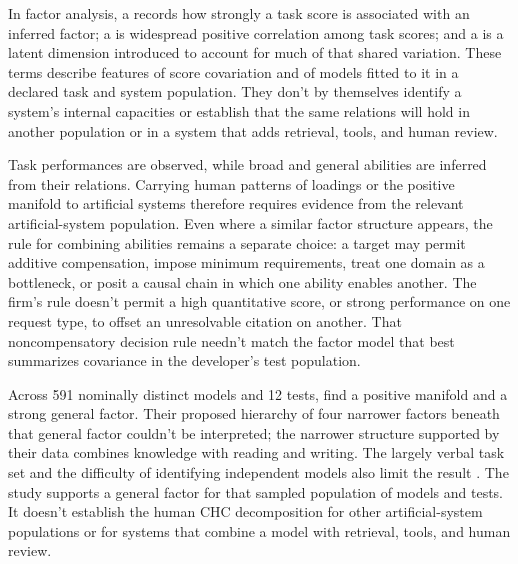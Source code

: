 \documentclass[12pt]{article}
\begin{document}
In factor analysis, a  records how strongly a task score is associated with an inferred factor; a  is widespread positive correlation among task scores; and a  is a latent dimension introduced to account for much of that shared variation. These terms describe features of score covariation and of models fitted to it in a declared task and system population. They don't by themselves identify a system's internal capacities or establish that the same relations will hold in another population or in a system that adds retrieval, tools, and human review.

Task performances are observed, while broad and general abilities are inferred from their relations. Carrying human patterns of loadings or the positive manifold to artificial systems therefore requires evidence from the relevant artificial-system population. Even where a similar factor structure appears, the rule for combining abilities remains a separate choice: a target may permit additive compensation, impose minimum requirements, treat one domain as a bottleneck, or posit a causal chain in which one ability enables another. The firm's rule doesn't permit a high quantitative score, or strong performance on one request type, to offset an unresolvable citation on another. That noncompensatory decision rule needn't match the factor model that best summarizes covariance in the developer's test population.

Across 591 nominally distinct models and 12 tests, \textcite[4--5]{ilicGignac2024cognitiveCapabilities} find a positive manifold and a strong general factor. Their proposed hierarchy of four narrower factors beneath that general factor couldn't be interpreted; the narrower structure supported by their data combines knowledge with reading and writing. The largely verbal task set and the difficulty of identifying independent models also limit the result \citep[7--9]{ilicGignac2024cognitiveCapabilities}. The study supports a general factor for that sampled population of models and tests. It doesn't establish the human CHC decomposition for other artificial-system populations or for systems that combine a model with retrieval, tools, and human review.
\end{document}
